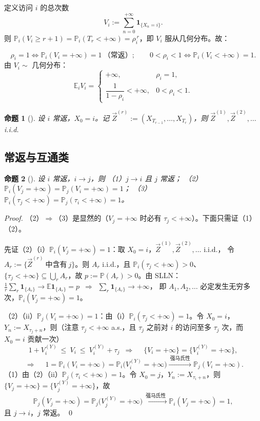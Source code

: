 \documentclass[lang=cn,10pt,newtx,thmcnt=chapter,mode=simple]{vividbook}
\providecommand{\E}{}\renewcommand{\E}{\mathbb{E}}
\providecommand{\Pp}{}\renewcommand{\Pp}{\mathbb{P}}
\newcommand{\ind}[1]{\mathbf{1}_{\{#1\}}}
\newcommand{\darr}{\;\Rightarrow\;}
\newcommand{\reach}{\to}
\theoremstyle{vividthm}
\newtheorem*{vividproposition}{命题}
\theoremstyle{vividdef}
\theoremstyle{vividexa}
\theoremstyle{vividrem}
\renewenvironment{proposition}[1][]{\begin{vividproposition}[#1]}{\end{vividproposition}}
\begin{document}
定义访问 $i$ 的总次数
\[
V_i:=\sum_{n=0}^{+\infty}\ind{X_n=i}.
\]
则 $\Pp_i(V_i\ge r+1)=\Pp_i(T_r<+\infty)=\rho_i^{\,r}$，即 $V_i$ 服从几何分布。故：

\[
\boxed{\ \rho_i=1\iff\Pp_i(V_i=+\infty)=1\ \text{（常返）};\qquad
0<\rho_i<1\iff\Pp_i(V_i<+\infty)=1.\ }
\]
由 $V_i\sim$ 几何分布：
\[
\E_iV_i=
\begin{cases}
+\infty, & \rho_i=1,\\[0.2em]
\dfrac{1}{1-\rho_i}<+\infty, & 0<\rho_i<1.
\end{cases}
\]

\begin{proposition}
设 $i$ 常返，$X_0=i$。记 $\vec{Z}^{(r)}:=(X_{T_{r-1}},\dots,X_{T_r})$，则
$\vec{Z}^{(1)},\vec{Z}^{(2)},\dots$ i.i.d.
\end{proposition}

\subsection{常返与互通类}

\begin{proposition}
设 $i$ 常返，$i\reach j$，则
（1）$j\reach i$ 且 $j$ 常返；
（2）$\Pp_i(V_j=+\infty)=\Pp_j(V_i=+\infty)=1$；
（3）$\Pp_i(\tau_j<+\infty)=\Pp_j(\tau_i<+\infty)=1$。
\end{proposition}

\begin{proof}
（2）$\Rightarrow$（3）是显然的（$V_j=+\infty$ 时必有 $\tau_j<+\infty$）。下面只需证（1）（2）。

先证（2）（i）$\Pp_i(V_j=+\infty)=1$：取 $X_0=i$，$\vec{Z}^{(1)},\vec{Z}^{(2)},\dots$ i.i.d.，
令 $A_r:=\{\vec{Z}^{(r)}\ \text{中含有}\ j\}$。则 $A_r$ i.i.d.，且
$\Pp_i(\tau_j<+\infty)>0$、$\{\tau_j<+\infty\}\subseteq\bigcup_rA_r$，故
$p:=\Pp(A_r)>0$。由 SLLN：
$\tfrac1r\sum_r\ind{A_r}\to\E\ind{A_r}=p\ \darr\ \sum_r\ind{A_r}\to+\infty$，
即 $A_1,A_2,\dots$ 必定发生无穷多次，$\Pp_i(V_j=+\infty)=1$。

（2）（ii）$\Pp_j(V_i=+\infty)=1$：由（i）$\Pp_i(\tau_j<+\infty)=1$。令 $X_0=i$，
$Y_n:=X_{\tau_j+n}$，则（注意 $\tau_j<+\infty$ a.s.，且 $\tau_j$ 之前对 $i$ 的访问至多
$\tau_j$ 次，而 $X_0=i$ 贡献一次）
\[
1+V_i^{(Y)}\ \le\ V_i\ \le\ V_i^{(Y)}+\tau_j
\ \darr\quad \{V_i=+\infty\}=\{V_i^{(Y)}=+\infty\},
\]
\[
\darr\quad 1=\Pp_i(V_i=+\infty)=\Pp_i\bigl(V_i^{(Y)}=+\infty\bigr)
\xrightarrow{\ \text{强马氏性}\ }\Pp_j(V_i=+\infty).
\]
（1）由（2）（ii）$\Pp_j(\tau_i<+\infty)=1$。令 $X_0=j$，$Y_n:=X_{\tau_i+n}$，则
$\{V_j=+\infty\}=\{V_j^{(Y)}=+\infty\}$，故
\[
\Pp_j(V_j=+\infty)=\Pp_j\bigl(V_j^{(Y)}=+\infty\bigr)
\xrightarrow{\ \text{强马氏性}\ }\Pp_i(V_j=+\infty)=1,
\]
且 $j\reach i$，$j$ 常返。 \qed
\end{proof}
\end{document}
